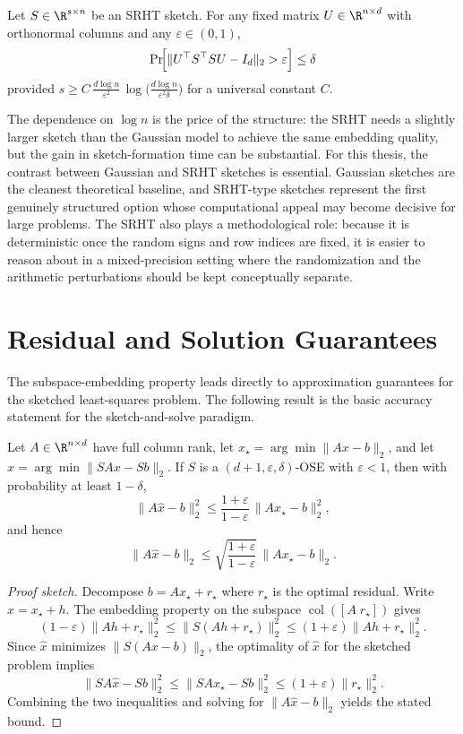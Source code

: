 \begin{proposition} \label{prop:srht_ose}
	Let \(S \in \R^{s \times n}\) be an SRHT sketch. For any fixed matrix \(U \in \R^{n \times d}\) with orthonormal columns and any \(\varepsilon \in (0,1)\),
	\[
		\Pr\!\Bigl[\|U^\top S^\top S U - I_d\|_2 > \varepsilon\Bigr] \le \delta
	\]
	provided \(s \ge C\,\frac{d\log n}{\varepsilon^2}\,\log\!\bigl(\frac{d\log n}{\varepsilon^2\delta}\bigr)\) for a universal constant \(C\).
\end{proposition}

The dependence on \(\log n\) is the price of the structure: the SRHT needs a slightly larger sketch than the Gaussian model to achieve the same embedding quality, but the gain in sketch-formation time can be substantial. For this thesis, the contrast between Gaussian and SRHT sketches is essential. Gaussian sketches are the cleanest theoretical baseline, and SRHT-type sketches represent the first genuinely structured option whose computational appeal may become decisive for large problems. The SRHT also plays a methodological role: because it is deterministic once the random signs and row indices are fixed, it is easier to reason about in a mixed-precision setting where the randomization and the arithmetic perturbations should be kept conceptually separate.

\section{Residual and Solution Guarantees}

The subspace-embedding property leads directly to approximation guarantees for the sketched least-squares problem. The following result is the basic accuracy statement for the sketch-and-solve paradigm.

\begin{proposition} \label{prop:sketched_residual}
	Let \(A \in \R^{n \times d}\) have full column rank, let \(x_\star = \arg\min\|Ax - b\|_2\), and let \(\hat x = \arg\min\|SAx - Sb\|_2\). If \(S\) is a \((d+1,\varepsilon,\delta)\)-OSE with \(\varepsilon < 1\), then with probability at least \(1-\delta\),
	\[
		\|A\hat x - b\|_2^2 \le \frac{1+\varepsilon}{1-\varepsilon}\,\|Ax_\star - b\|_2^2,
	\]
	and hence
	\[
		\|A\hat x - b\|_2 \le \sqrt{\frac{1+\varepsilon}{1-\varepsilon}}\,\|Ax_\star - b\|_2.
	\]
\end{proposition}

\begin{proof}[Proof sketch]
	Decompose \(b = Ax_\star + r_\star\) where \(r_\star\) is the optimal residual. Write \(\hat x = x_\star + h\). The embedding property on the subspace \(\operatorname{col}([A\; r_\star])\) gives
	\[
		(1-\varepsilon)\|Ah + r_\star\|_2^2 \le \|S(Ah + r_\star)\|_2^2 \le (1+\varepsilon)\|Ah + r_\star\|_2^2.
	\]
	Since \(\hat x\) minimizes \(\|S(Ax - b)\|_2\), the optimality of \(\hat x\) for the sketched problem implies
	\[
		\|SA\hat x - Sb\|_2^2 \le \|SAx_\star - Sb\|_2^2 \le (1+\varepsilon)\|r_\star\|_2^2.
	\]
	Combining the two inequalities and solving for \(\|A\hat x - b\|_2\) yields the stated bound.
\end{proof}

